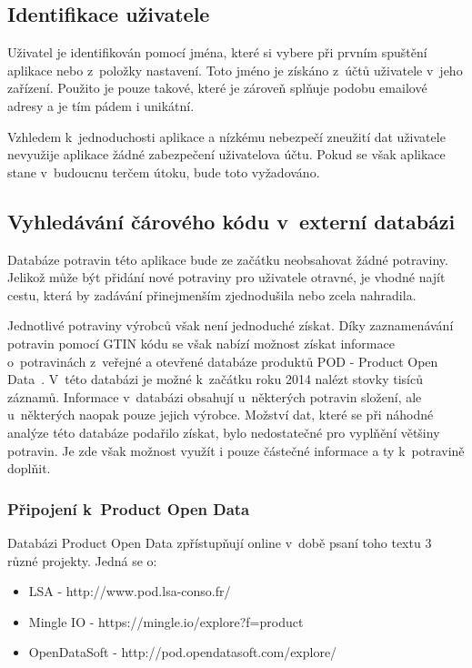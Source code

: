 \documentclass[thesis=B,czech]{FITthesis}[2013/10/20]
\begin{document}
\clearpage

\subsection{Identifikace uživatele}

Uživatel je identifikován pomocí jména, které si vybere při prvním spuštění aplikace nebo z~položky nastavení. Toto jméno je získáno z~účtů uživatele v~jeho zařízení. Použito je pouze takové, které je zároveň splňuje podobu emailové adresy a je tím pádem i unikátní.

Vzhledem k~jednoduchosti aplikace a nízkému nebezpečí zneužití dat uživatele nevyužije aplikace žádné zabezpečení uživatelova účtu. Pokud se však aplikace stane v~budoucnu terčem útoku, bude toto vyžadováno.

\subsection{Vyhledávání čárového kódu v~externí databázi}

Databáze potravin této aplikace bude ze začátku neobsahovat žádné potraviny. Jelikož může být přidání nové potraviny pro uživatele otravné, je vhodné najít cestu, která by zadávání přinejmenším zjednodušila nebo zcela nahradila.

Jednotlivé potraviny výrobců však není jednoduché získat. Díky zaznamenávání potravin pomocí GTIN kódu se však nabízí možnost získat informace o~potravinách z~veřejné a otevřené databáze produktů POD - Product Open Data~\cite{pod}. V~této databázi je možné k~začátku roku 2014 nalézt stovky tisíců záznamů. Informace v~databázi obsahují u~některých potravin složení, ale u~některých naopak pouze jejich výrobce. Možství dat, které se při náhodné analýze této databáze podařilo získat, bylo nedostatečné pro vyplňění většiny potravin. Je zde však možnost využít i pouze částečné informace a ty k~potravině doplňit.

\subsubsection{Připojení k~Product Open Data}

Databázi Product Open Data zpřístupňují online v~době psaní toho textu 3 různé projekty. Jedná se o:
\begin{itemize}
  \item{LSA - http://www.pod.lsa-conso.fr/}
  \item{Mingle IO - https://mingle.io/explore?f=product}
  \item{OpenDataSoft - http://pod.opendatasoft.com/explore/}
\end{itemize}
\end{document}
